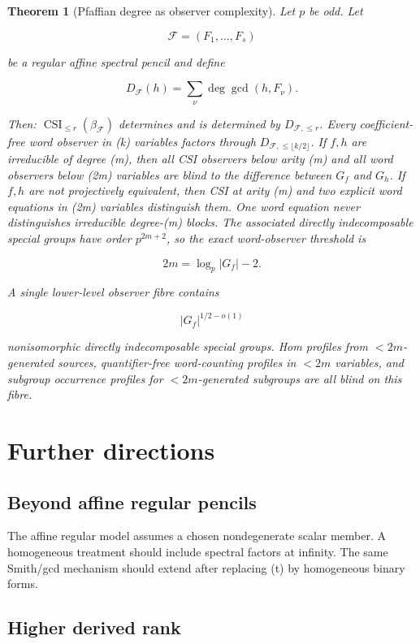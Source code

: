 \documentclass[11pt]{article}
\newtheorem{theorem}{Theorem}[section]
\begin{document}
\begin{theorem}[Pfaffian degree as observer complexity]
Let $p$ be odd. Let

\[
\mathcal F=(F_1,\ldots,F_s)
\]

be a regular affine spectral pencil and define

\[
D_{\mathcal F}(h)=\sum_\nu\deg\gcd(h,F_\nu).
\]

Then: $\operatorname{CSI}_{\le r}(\beta_{\mathcal F})$ determines and is determined by $D_{\mathcal F,\le r}$. Every coefficient-free word observer in (k) variables factors through $D_{\mathcal F,\le\lfloor k/2\rfloor}$. If $f,h$ are irreducible of degree (m), then all CSI observers below arity (m) and all word observers below (2m) variables are blind to the difference between $G_f$ and $G_h$. If $f,h$ are not projectively equivalent, then CSI at arity (m) and two explicit word equations in (2m) variables distinguish them. One word equation never distinguishes irreducible degree-(m) blocks. The associated directly indecomposable special groups have order $p^{2m+2}$, so the exact word-observer threshold is

\[
2m=\log_p|G_f|-2.
\]

A single lower-level observer fibre contains

\[
|G_f|^{1/2-o(1)}
\]

nonisomorphic directly indecomposable special groups. Hom profiles from $<2m$-generated sources, quantifier-free word-counting profiles in $<2m$ variables, and subgroup occurrence profiles for $<2m$-generated subgroups are all blind on this fibre.

\end{theorem}

\section{Further directions}

\subsection{Beyond affine regular pencils}

The affine regular model assumes a chosen nondegenerate scalar member. A homogeneous treatment should include spectral factors at infinity. The same Smith/gcd mechanism should extend after replacing (t) by homogeneous binary forms.

\subsection{Higher derived rank}
\end{document}
